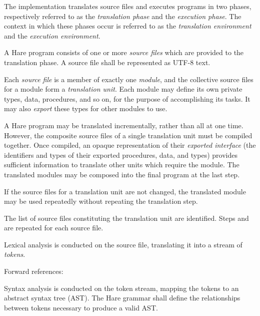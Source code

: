 
\specitem
The implementation translates source files and executes programs in two phases,
respectively referred to as the \textit{translation phase} and the
\textit{execution phase}. The context in which these phases occur is referred
to as the \textit{translation environment} and the \textit{execution
environment}.


\specsubitem
A Hare program consists of one or more \textit{source files} which are provided
to the translation phase. A source file shall be represented as UTF-8 text.

\specsubitem
Each \textit{source file} is a member of exactly one \textit{module}, and the
collective source files for a module form a \textit{translation unit}. Each
module may define its own private types, data, procedures, and so on, for the
purpose of accomplishing its tasks. It may also \textit{export} these types for
other modules to use.

\specsubitem
A Hare program may be translated incrementally, rather than all at one time.
However, the composite source files of a single translation unit must be
compiled together. Once compiled, an opaque representation of their
\textit{exported interface} (the identifiers and types of their exported
procedures, data, and types) provides sufficient information to translate other
units which require the module. The translated modules may be composed into the
final program at the last step.

\specsubitem
If the source files for a translation unit are not changed, the translated
module may be used repeatedly without repeating the translation step.


\specsubitem
The list of source files constituting the translation unit are identified. Steps
 and  are
repeated for each source file.

\specsubitem
Lexical analysis is conducted on the source file, translating it into a stream
of \textit{tokens}.

Forward references: 

\specsubitem
Syntax analysis is conducted on the token stream, mapping the tokens to an
abstract syntax tree (AST). The Hare grammar shall define the relationships
between tokens necessary to produce a valid AST.

